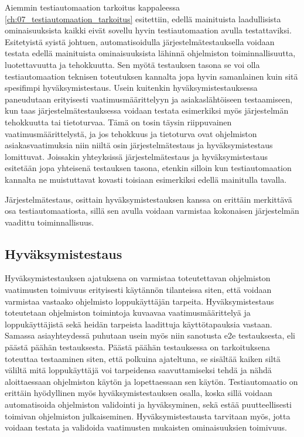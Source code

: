    Aiemmin testiautomaation tarkoitus kappaleessa \ref{ch:07_testiautomaation_tarkoitus} esitettiin, edellä mainituista laadullisista ominaisuuksista kaikki eivät sovellu hyvin testiautomaation avulla testattaviksi.
    Esitetyistä syistä johtuen, automatisoidulla järjestelmätestauksella voidaan testata edellä mainituista ominaisuuksista lähinnä ohjelmiston toiminnallisuutta, luotettavuutta ja tehokkuutta.
    Sen myötä testauksen tasona se voi olla testiautomaation teknisen toteutuksen kannalta jopa hyvin samanlainen kuin sitä spesifimpi hyväksymistestaus.
    Usein kuitenkin hyväksymistestauksessa paneudutaan erityisesti vaatimusmäärittelyyn ja asiakaslähtöiseen testaamiseen, kun taas järjestelmätestauksessa voidaan testata esimerkiksi myös järjestelmän tehokkuutta tai tietoturvaa.
    Tämä on tosin täysin riippuvainen vaatimusmäärittelystä, ja jos tehokkuus ja tietoturva ovat ohjelmiston asiakasvaatimuksia niin niiltä osin järjestelmätestaus ja hyväksymistestaus lomittuvat.
    Joissakin yhteyksissä järjestelmätestaus ja hyväksymistestaus esitetään jopa yhteisenä testauksen tasona, etenkin silloin kun testiautomaation kannalta ne muistuttavat kovasti toisiaan esimerkiksi edellä mainitulla tavalla.

    Järjestelmätestaus, osittain hyväksymistestauksen kanssa on erittäin merkittävä osa testiautomaatiosta, sillä sen avulla voidaan varmistaa kokonaisen järjestelmän vaadittu toiminnallisuus.

  \subsection{Hyväksymistestaus} \label{ch:07_hyvaksymistestaus}

    Hyväksymistestauksen ajatuksena on varmistaa toteutettavan ohjelmiston vaatimusten toimivuus erityisesti käytännön tilanteissa siten, että voidaan varmistaa vastaako ohjelmisto loppukäyttäjän tarpeita.
    Hyväksymistestaus toteutetaan ohjelmiston toimintoja kuvaavaa vaatimusmäärittelyä ja loppukäyttäjistä sekä heidän tarpeista laadittuja käyttötapauksia vastaan.
    Samassa asiayhteydessä puhutaan usein myös niin sanotusta e2e testauksesta, eli päästä päähän testauksesta.
    Päästä päähän testauksessa on tarkoituksena toteuttaa testaaminen siten, että polkuina ajateltuna, se sisältää kaiken siltä väliltä mitä loppukäyttäjä voi tarpeidensa saavuttamiseksi tehdä ja nähdä aloittaessaan ohjelmiston käytön ja lopettaessaan sen käytön.
    Testiautomaatio on erittäin hyödyllinen myös hyväksymistestauksen osalla, koska sillä voidaan automatisoida ohjelmiston validointi ja hyväksyminen, sekä estää puutteellisesti toimivan ohjelmiston julkaiseminen.
    Hyväksymistestausta tarvitaan myös, jotta voidaan testata ja validoida vaatimusten mukaisten ominaisuuksien toimivuus.

